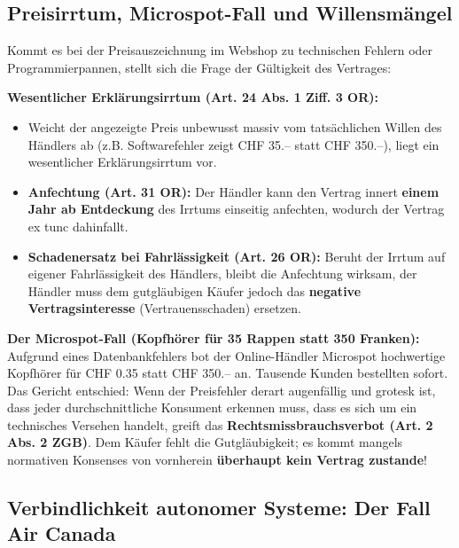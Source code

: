 \subsection{Preisirrtum, Microspot-Fall und Willensmängel}

Kommt es bei der Preisauszeichnung im Webshop zu technischen Fehlern oder Programmierpannen, stellt sich die Frage der Gültigkeit des Vertrages:

\begin{theorem}
    \textbf{Wesentlicher Erklärungsirrtum (Art. 24 Abs. 1 Ziff. 3 OR):}
    \begin{itemize}
        \item Weicht der angezeigte Preis unbewusst massiv vom tatsächlichen Willen des Händlers ab (z.B. Softwarefehler zeigt CHF 35.-- statt CHF 350.--), liegt ein wesentlicher Erklärungsirrtum vor.
        \item \textbf{Anfechtung (Art. 31 OR):} Der Händler kann den Vertrag innert \textbf{einem Jahr ab Entdeckung} des Irrtums einseitig anfechten, wodurch der Vertrag ex tunc dahinfallt.
        \item \textbf{Schadenersatz bei Fahrlässigkeit (Art. 26 OR):} Beruht der Irrtum auf eigener Fahrlässigkeit des Händlers, bleibt die Anfechtung wirksam, der Händler muss dem gutgläubigen Käufer jedoch das \textbf{negative Vertragsinteresse} (Vertrauensschaden) ersetzen.
    \end{itemize}
\end{theorem}

\begin{example}
    \textbf{Der Microspot-Fall (Kopfhörer für 35 Rappen statt 350 Franken):} \\
    Aufgrund eines Datenbankfehlers bot der Online-Händler Microspot hochwertige Kopfhörer für CHF 0.35 statt CHF 350.-- an. Tausende Kunden bestellten sofort. Das Gericht entschied: Wenn der Preisfehler derart augenfällig und grotesk ist, dass jeder durchschnittliche Konsument erkennen muss, dass es sich um ein technisches Versehen handelt, greift das \textbf{Rechtsmissbrauchsverbot (Art. 2 Abs. 2 ZGB)}. Dem Käufer fehlt die Gutgläubigkeit; es kommt mangels normativen Konsenses von vornherein \textbf{überhaupt kein Vertrag zustande}!
\end{example}

\subsection{Verbindlichkeit autonomer Systeme: Der Fall Air Canada}

